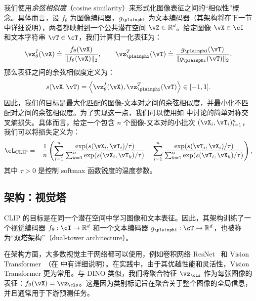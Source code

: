 \documentclass[../../book-main_zh.tex]{subfiles}
\begin{document}
我们使用\textit{余弦相似度}（cosine similarity）来形式化图像表征之间的“相似性”概念。具体而言，设 \(f_{\theta}\) 为图像编码器，\(g_{\plainphi}\) 为文本编码器（其架构将在下一节中详细说明），两者都映射到一个公共潜在空间 \(\vZ \in \mathbb{R}^{d}\)。给定图像 \(\vX \in \cI\) 和文本字符串 \(\vT \in \cT\)，我们计算归一化表征为：
\begin{equation}
    \vz^{I}_{\theta}(\vX) \doteq \frac{f_{\theta}(\vX)}{\|f_{\theta}(\vX)\|_2},
    \qquad
    \vz^{T}_{\plainphi}(\vT) \doteq \frac{g_{\plainphi}(\vT)}{\|g_{\plainphi}(\vT)\|_2}.
\end{equation}
那么表征之间的余弦相似度定义为：
\begin{equation}
    s(\vX,\vT)
    =
    \left\langle \vz^{I}_{\theta}(\vX), \vz^{T}_{\plainphi}(\vT)\right\rangle
    \in [-1,1].
\end{equation}
因此，我们的目标是最大化匹配的图像-文本对之间的余弦相似度，并最小化不匹配对之间的余弦相似度。为了实现这一点，我们可以使用如  中讨论的简单对称交叉熵损失。具体而言，给定一个包含 \(n\) 个图像-文本对的小批次 \((\vX_i, \vT_i)_{i=1}^{n}\)，我们可以将损失定义为：
\begin{equation}\label{eq:practical_clip_loss}
    \cL_{\text{CLIP}} = -\frac{1}{n}\left(
    \sum_{i=1}^{n}
    \frac{\exp(s(\vX_i,\vT_i)/\tau)}{\sum_{k=1}^{n}\exp(s(\vX_i,\vT_k)/\tau)}
    +
    \sum_{i=1}^{n}
    \frac{\exp(s(\vT_i,\vX_i)/\tau)}{\sum_{k=1}^{n}\exp(s(\vT_i,\vX_k)/\tau)}
    \right),
\end{equation}
其中 \(\tau > 0\) 是控制 softmax 函数锐度的温度参数。

\subsection{架构：视觉塔}\label{sub:clip_vision_tower}
CLIP 的目标是在同一个潜在空间中学习图像和文本表征。因此，其架构训练了一个视觉编码器 \(f_{\theta}: \cI \to \mathbb{R}^{d} \) 和一个文本编码器 \(g_{\plainphi}: \cT \to \mathbb{R}^{d} \)，也被称为“双塔架构”（dual-tower architecture）。

在架构方面，大多数视觉主干网络都可以使用，例如卷积网络 ResNet~\citep{He2016-lc} 和 Vision Transformer~\citep{dosovitskiy2020image}（在  中有详细说明）。在实践中，由于其优越性能和灵活性，Vision Transformer 更为常用。与 DINO 类似，我们将聚合特征 \(\vz_{\cls}\) 作为每张图像的表征：\(f_{\theta}(\vX) = \vz_{\cls}\)。这是因为类别标记旨在聚合关于整个图像的全局信息，并且通常用于下游预测任务。
\end{document}
